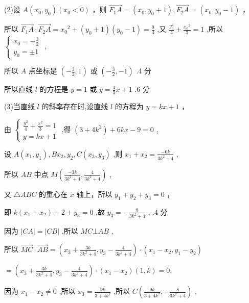 \documentclass[10pt]{article}
\begin{document}
(2)设 \(A\left( {{x}_{0},{y}_{0}}\right) \left( {{x}_{0} < 0}\right)\) ，则 \(\overrightarrow{{F}_{1}A} = \left( {{x}_{0},{y}_{0} + 1}\right) ,\overrightarrow{{F}_{2}A} = \left( {{x}_{0},{y}_{0} - 1}\right)\) ，

所以 \(\overrightarrow{{F}_{1}A} \cdot  \overrightarrow{{F}_{2}A} = {x}_{0}{}^{2} + \left( {{y}_{0} + 1}\right) \left( {{y}_{0} - 1}\right)  = \frac{9}{4}\) ,又 \(\frac{{y}_{0}^{2}}{4} + \frac{{x}_{0}{}^{2}}{3} = 1\) ,所以 \(\left\{  \begin{array}{l} {x}_{0} =  - \frac{3}{2} \\  {y}_{0} =  \pm  1 \end{array}\right.\) ,

所以 \(A\) 点坐标是 \(\left( {-\frac{3}{2},1}\right)\) 或 \(\left( {-\frac{3}{2}, - 1}\right)\) .4 分

所以直线 \(l\) 的方程是 \(y = 1\) 或 \(y = \frac{4}{3}x + 1\) .6 分

(3)当直线 \(l\) 的斜率存在时,设直线 \(l\) 的方程为 \(y = {kx} + 1\) ，

由 \(\left\{  \begin{array}{l} \frac{{y}^{2}}{4} + \frac{{x}^{2}}{3} = 1 \\  y = {kx} + 1 \end{array}\right.\) ,得 \(\left( {3 + 4{k}^{2}}\right)  + {6kx} - 9 = 0\) ,

设 \(A\left( {{x}_{1},{y}_{1}}\right) ,B{x}_{2},{y}_{2},C\left( {{x}_{3},{y}_{3}}\right)\) ,则 \({x}_{1} + {x}_{2} = \frac{-{6k}}{3{k}^{2} + 4}\) ,

所以 \({AB}\) 中点 \(M\left( {\frac{-{3k}}{3{k}^{2} + 4},\frac{4}{3{k}^{2} + 4}}\right)\) ,

又 \(\bigtriangleup  {ABC}\) 的重心在 \(x\) 轴上，所以 \({y}_{1} + {y}_{2} + {y}_{3} = 0\) ，

即 \(k\left( {{x}_{1} + {x}_{2}}\right)  + 2 + {y}_{3} = 0\) ,故 \({y}_{3} =  - \frac{8}{3{k}^{2} + 4}\) , .4 分

因为 \(\left| {CA}\right|  = \left| {CB}\right|\) ,所以 \({MC} \bot  {AB}\) ,

所以 \(\overrightarrow{MC} \cdot  \overrightarrow{AB} = \left( {{x}_{3} + \frac{3k}{3{k}^{2} + 4},{y}_{3} - \frac{4}{3{k}^{2} + 4}}\right)  \cdot  \left( {{x}_{1} - {x}_{2},{y}_{1} - {y}_{2}}\right)\)

\(= \left( {{x}_{3} + \frac{3k}{3{k}^{2} + 4},{y}_{3} - \frac{4}{3{k}^{2} + 4}}\right)  \cdot  \left( {{x}_{1} - {x}_{2}}\right) \left( {1,k}\right)  = 0,\)

因为 \({x}_{1} - {x}_{2} \neq  0\) ,所以 \({x}_{3} = \frac{9k}{3 + 4{k}^{2}}\) ,所以 \(C\left( {\frac{9k}{3 + 4{k}^{2}}, - \frac{8}{3{k}^{2} + 4}}\right)\) ,
\end{document}

